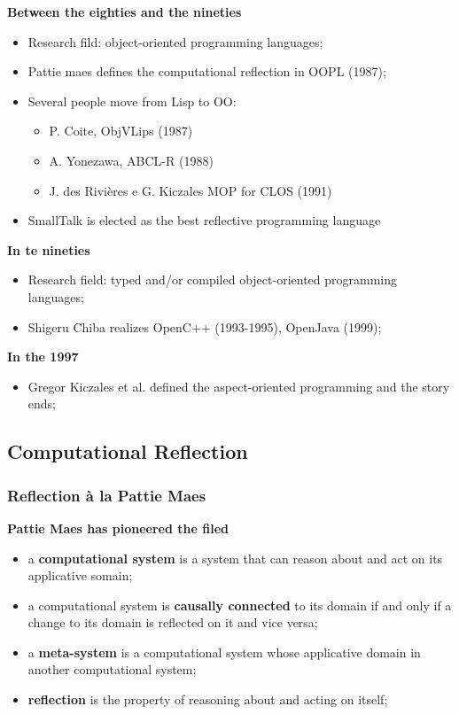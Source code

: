 \textbf{Between the eighties and the nineties}
\begin{itemize}
	\item Research fild: object-oriented programming languages;
	\item Pattie maes defines the computational reflection in OOPL (1987);
	\item Several people move from Lisp to OO:
		\begin{itemize}
			\item P. Coite, ObjVLips (1987)
			\item A. Yonezawa, ABCL-R (1988)
			\item J. des Rivières e G. Kiczales MOP for CLOS (1991)
		\end{itemize}
	\item SmallTalk is elected as the best reflective programming language
\end{itemize}

\textbf{In te nineties}
\begin{itemize}
	\item Research field: typed and/or compiled object-oriented programming languages;
	\item Shigeru Chiba realizes OpenC++ (1993-1995), OpenJava (1999);
\end{itemize}

\textbf{In the 1997}
\begin{itemize}
	\item Gregor Kiczales et al. defined the aspect-oriented programming and the story ends;
\end{itemize}

\subsection{Computational Reflection}

\subsubsection{Reflection à la Pattie Maes}

\textbf{Pattie Maes has pioneered the filed}
\begin{itemize}
	\item a \textbf{computational system} is a system that can reason about and act on its applicative somain;
	\item a computational system is \textbf{causally connected} to its domain if and only if a change to its domain is reflected on it and vice versa;
	\item a \textbf{meta-system} is a computational system whose applicative domain in another computational system;
	\item \textbf{reflection} is the property of reasoning about and acting on itself;
\end{itemize}

